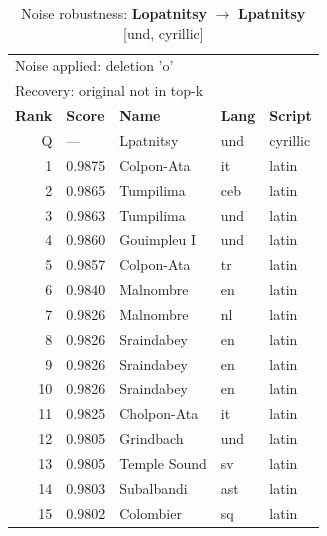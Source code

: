 \begin{table}[htbp]
\centering
\small
\caption{Noise robustness: \textbf{Lopatnitsy} $\rightarrow$ \textbf{Lpatnitsy} [und, cyrillic]}
\label{tab:noise-15}
\begin{tabular}{rllll}
\toprule
\multicolumn{5}{l}{\small Noise applied: deletion 'o'} \\
\multicolumn{5}{l}{\small Recovery: original not in top-k} \\
\midrule
\textbf{Rank} & \textbf{Score} & \textbf{Name} & \textbf{Lang} & \textbf{Script} \\
\midrule
\rowcolor{gray!20} Q & --- & Lpatnitsy & und & cyrillic \\
\midrule
1 & 0.9875 & Colpon-Ata & it & latin \\
2 & 0.9865 & Tumpilima & ceb & latin \\
3 & 0.9863 & Tumpilima & und & latin \\
4 & 0.9860 & Gouimpleu I & und & latin \\
5 & 0.9857 & Colpon-Ata & tr & latin \\
6 & 0.9840 & Malnombre & en & latin \\
7 & 0.9826 & Malnombre & nl & latin \\
8 & 0.9826 & Sraindabey & en & latin \\
9 & 0.9826 & Sraindabey & en & latin \\
10 & 0.9826 & Sraindabey & en & latin \\
11 & 0.9825 & Cholpon-Ata & it & latin \\
12 & 0.9805 & Grindbach & und & latin \\
13 & 0.9805 & Temple Sound & sv & latin \\
14 & 0.9803 & Subalbandi & ast & latin \\
15 & 0.9802 & Colombier & sq & latin \\
\bottomrule
\end{tabular}
\end{table}

